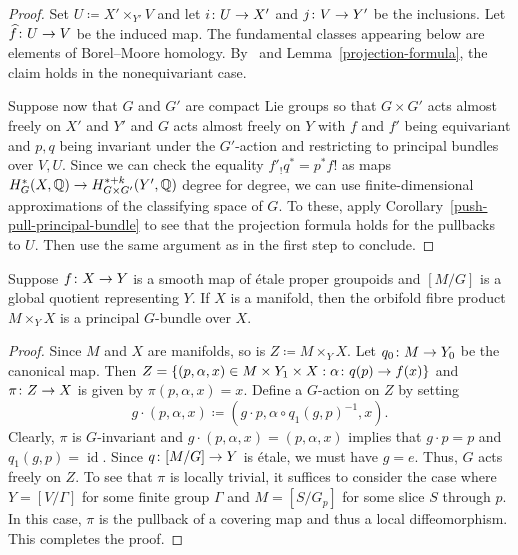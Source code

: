 \documentclass[AHL,Unicode,longabstracts]{cedram}
\newcommand{\g}{\circ}
\newcommand{\inv}{^{-1}}
\newcommand{\cl}{\colon}
\newcommand{\bQ}{\mathbb{Q}}
\DeclareMathOperator{\ide}{id}
\renewcommand*{\to}{\mathchoice{\longrightarrow}{\rightarrow}{\rightarrow}{\rightarrow}}
\let\oldin\in
\renewcommand{\in}{\mathchoice{\oldin}{\oldin}{\,\oldin\,}{\,\oldin\,}}
\let\oldhat\hat
\renewcommand*{\hat}[1]{\mathchoice{\widehat{#1}}{\widehat{#1}}{\oldhat{#1}}{\oldhat{#1}}}
\begin{document}
\begin{proof}
Set $U \coloneqq X'\times_{Y'} V$ and let $i \cl U \to X'$ and $j \cl V\to Y'$ be the inclusions. Let $\hat{f}\cl U\to V$ be the induced map. The fundamental classes appearing below are elements of Borel--Moore homology. By~\cite[Section~V.10(57), Corollary~V.10.2]{Bre12} and Lemma~\ref{projection-formula}, the claim holds in the nonequivariant case.


Suppose now that $G$ and $G'$ are compact Lie groups so that $G\times G'$ acts almost freely on $X'$ and $Y'$ and $G$ acts almost freely on $Y$ with $f$ and $f'$ being equivariant and $p,q$ being invariant under the $G'$-action and restricting to principal bundles over $V,U$. Since we can check the equality $f'_!q^* = p^*f!$ as maps $H^*_G(X,\bQ)\to H^{*+k}_{G\times G'}(Y',\bQ)$ degree for degree, we can use finite-dimensional approximations of the classifying space of $G$. To these, apply Corollary~\ref{push-pull-principal-bundle} to see that the projection formula holds for the pullbacks to $U$. Then use the same argument as in the first step to conclude.
\end{proof}

\begin{lemm}\label{resolution-fibre-product}
Suppose $f\cl X\to Y$ is a smooth map of étale proper groupoids and $[M/G]$ is a global quotient representing $Y$. If $X$ is a manifold, then the orbifold fibre product $M \times_Y X$ is a principal $G$-bundle over $X$.
\end{lemm}

\begin{proof}
Since $M$ and $X$ are manifolds, so is $Z \coloneqq M \times_Y X$. Let $q_0 \cl M\to Y_0$ be the canonical map. Then $Z = \{(p,\alpha,x)\in M\times Y_1\times X: \alpha \cl q(p)\to f(x)\}$
and $\pi \cl Z \to X$ is given by $\pi(p,\alpha,x) = x$. Define a $G$-action on $Z$ by setting
\[
g \cdot (p,\alpha,x) \coloneqq \left(g\cdot p,\alpha \g q_1(g,p)\inv,x\right).
\]
Clearly, $\pi$ is $G$-invariant and $g\cdot (p,\alpha,x) = (p,\alpha,x)$ implies that $g\cdot p = p$ and $q_1(g,p) = \ide$. Since $q\cl [M/G]\to Y$ is étale, we must have $g = e$. Thus, $G$ acts freely on $Z$. To see that $\pi$ is locally trivial, it suffices to consider the case where $Y = [V/\Gamma]$ for some finite group $\Gamma$ and $M = [S/G_p]$ for some slice $S$ through $p$. In this case, $\pi$ is the pullback of a covering map and thus a local diffeomorphism. This completes the proof.
\end{proof}
\end{document}
